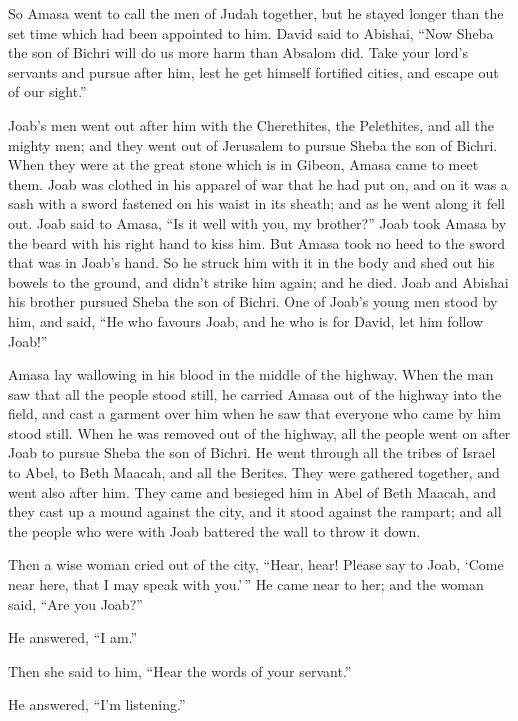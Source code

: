  So Amasa went to call the men of Judah together, but he
stayed longer than the set time which had been appointed to him.
 David said to Abishai, ``Now Sheba the son of Bichri will
do us more harm than Absalom did. Take your lord's servants and pursue
after him, lest he get himself fortified cities, and escape out of our
sight.''

 Joab's men went out after him with the Cherethites, the
Pelethites, and all the mighty men; and they went out of Jerusalem to
pursue Sheba the son of Bichri.  When they were at the great
stone which is in Gibeon, Amasa came to meet them. Joab was clothed in
his apparel of war that he had put on, and on it was a sash with a sword
fastened on his waist in its sheath; and as he went along it fell out.
 Joab said to Amasa, ``Is it well with you, my brother?''
Joab took Amasa by the beard with his right hand to kiss him.
 But Amasa took no heed to the sword that was in Joab's
hand. So he struck him with it in the body and shed out his bowels to
the ground, and didn't strike him again; and he died. Joab and Abishai
his brother pursued Sheba the son of Bichri.  One of Joab's
young men stood by him, and said, ``He who favours Joab, and he who is
for David, let him follow Joab!''

 Amasa lay wallowing in his blood in the middle of the
highway. When the man saw that all the people stood still, he carried
Amasa out of the highway into the field, and cast a garment over him
when he saw that everyone who came by him stood still. 
When he was removed out of the highway, all the people went on after
Joab to pursue Sheba the son of Bichri.  He went through
all the tribes of Israel to Abel, to Beth Maacah, and all the Berites.
They were gathered together, and went also after him.  They
came and besieged him in Abel of Beth Maacah, and they cast up a mound
against the city, and it stood against the rampart; and all the people
who were with Joab battered the wall to throw it down.

 Then a wise woman cried out of the city, ``Hear, hear!
Please say to Joab, `Come near here, that I may speak with you.'\,''
 He came near to her; and the woman said, ``Are you Joab?''

He answered, ``I am.''

Then she said to him, ``Hear the words of your servant.''

He answered, ``I'm listening.''

